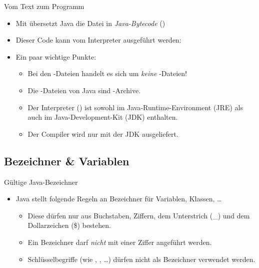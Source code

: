 \begin{frame}{Vom Text zum Programm}
    \begin{itemize}[<+(1)->]
        \widei
        \item Mit  übersetzt Java die Datei in \emph{Java-Bytecode}\pause{} ()
        \item Dieser Code kann vom Interpreter  ausgeführt werden:\pause{} 
        \item Ein paar wichtige Punkte: \begin{itemize}
            \item Bei den -Dateien handelt es sich um \emph{keine} -Dateien!
            \item Die -Dateien von Java sind -Archive.
            \item Der Interpreter () ist sowohl im Java-Runtime-Environment (JRE) als auch im Java-Development-Kit (JDK) enthalten.
            \item Der Compiler wird nur mit der JDK ausgeliefert.
        \end{itemize}
    \end{itemize}
\end{frame}

\subsection{Bezeichner \& Variablen}

\begin{frame}{Gültige Java-Bezeichner}
    \begin{itemize}[<+(1)->]
        \widei
        \item Java stellt folgende Regeln an Bezeichner für Variablen, Klassen, \ldots \begin{itemize}
            \item Diese dürfen nur aus Buchstaben, Ziffern, dem Unterstrich (\_) und dem Dollarzeichen (\$) bestehen.
            \item Ein Bezeichner darf \emph{nicht} mit einer Ziffer angeführt werden.
            \item Schlüsselbegriffe (wie , , \ldots) dürfen nicht als Bezeichner verwendet werden.
        \end{itemize}
    \end{itemize}
\end{frame}

